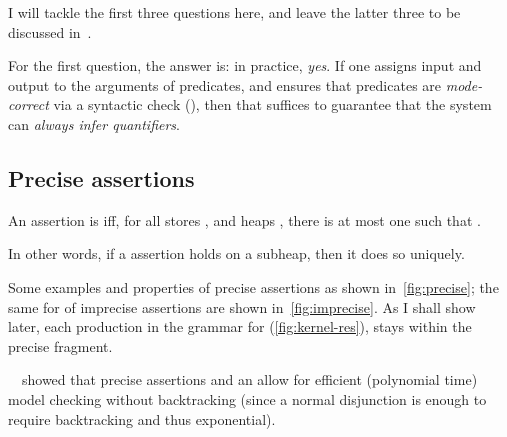 I will tackle the first three questions here, and leave the latter three
to be discussed in~.

For the first question, the answer is: in practice, \emph{yes}. If one assigns
input and output  to the arguments of 
predicates, and ensures that predicates are \emph{mode-correct} via a syntactic
check (), then that suffices to guarantee that the
system can \emph{always infer quantifiers}.%
%

\subsection{Precise assertions}\label{subsec:precise-assertion}

\begin{definition}%
\label{def:precise-assertion}
    \AP{} An assertion  is  iff, for all stores , and heaps
    , there is at most one  such that .

    In other words, if a  assertion holds on a subheap, then it
    does so uniquely.
\end{definition}

Some examples and properties of precise assertions as shown
in~\cref{fig:precise}; the same for of imprecise assertions are shown
in~\cref{fig:imprecise}. As I shall show later, each production in the grammar
for   (\cref{fig:kernel-res}), stays within the
precise fragment.

\begin{marginfigure}
\small%
%
\caption{Some examples and properties of precise assertions.}\label{fig:precise}
\end{marginfigure}

\citeauthor{brotherston2016model}~~showed that
precise assertions and an  allow for efficient (polynomial time)
model checking without backtracking (since a normal disjunction is enough to
require backtracking and thus exponential).


